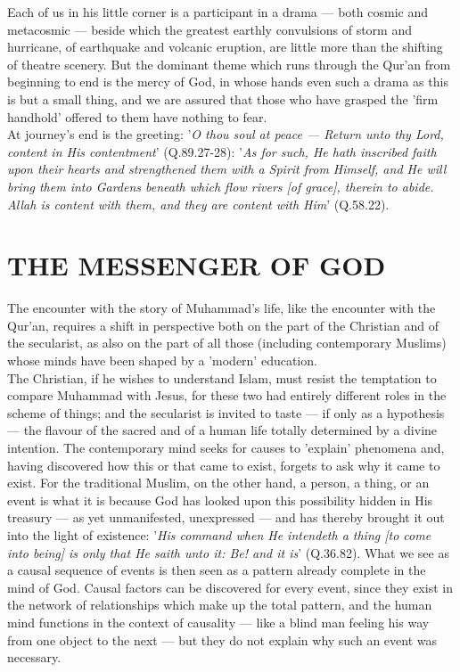 \documentclass[10pt, twoside,openright]{book}
\begin{document}
Each of us in his little corner is a participant in a drama --- both cosmic and metacosmic --- beside 
which the greatest earthly convulsions of storm and hurricane, of earthquake and volcanic eruption, 
are little more than the shifting of theatre scenery. But the dominant theme which runs through the 
Qur'an from beginning to end is the mercy of God, in whose hands even such a drama as this is but a 
small thing, and we are assured that those who have grasped the 'firm handhold' offered to them have 
nothing to fear. \\

At journey's end is the greeting: '\emph{O thou soul at peace --- Return unto thy Lord, content in His 
contentment}' (Q.89.27-28): '\emph{As for such, He hath inscribed faith upon their hearts and strengthened them with a Spirit from Himself, and He will bring them into Gardens beneath which flow rivers [of grace], therein to abide. Allah is content with them, and they are content with Him}' (Q.58.22). \\

\chapter{THE MESSENGER OF GOD}

The encounter with the story of Muhammad's life, like the encounter with the Qur'an, requires a shift 
in perspective both on the part of the Christian and of the secularist, as also on the part of all 
those (including contemporary Muslims) whose minds have been shaped by a 'modern' education. \\

The Christian, if he wishes to understand Islam, must resist the temptation to compare Muhammad with 
Jesus, for these two had entirely different roles in the scheme of things; and the secularist is 
invited to taste --- if only as a hypothesis --- the flavour of the sacred and of a human life totally 
determined by a divine intention. The contemporary mind seeks for causes to 'explain' phenomena and, 
having discovered how this or that came to exist, forgets to ask why it came to exist. For the 
traditional Muslim, on the other hand, a person, a thing, or an event is what it is because God has 
looked upon this possibility hidden in His treasury --- as yet unmanifested, unexpressed --- and has 
thereby brought it out into the light of existence: '\emph{His command when He intendeth a thing [to come into being] is only that He saith unto it: Be! and it is}' (Q.36.82). What we see as a causal sequence 
of events is then seen as a pattern already complete in the mind of God. Causal factors can be 
discovered for every event, since they exist in the network of relationships which make up the total 
pattern, and the human mind functions in the context of causality --- like a blind man feeling his way 
from one object to the next --- but they do not explain why such an event was necessary. \\
\end{document}
